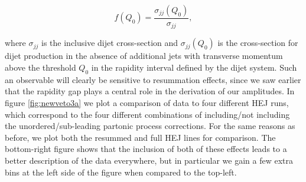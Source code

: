 \begin{equation}
f(Q_0) = \frac{\sigma_{jj}(Q_0)}{\sigma_{jj}},
\end{equation}

where $\sigma_{jj}$ is the inclusive dijet cross-section and $\sigma_{jj}(Q_0)$ is the cross-section for dijet production in the absence of additional jets with transverse momentum above the threshold $Q_0$ in the rapidity interval defined by the dijet system. Such an observable will clearly be sensitive to resummation effects, since we saw earlier that the rapidity gap plays a central role in the derivation of our amplitudes. In figure \ref{fig:newveto3a} we plot a comparison of data to four different HEJ runs, which correspond to the four different combinations of including/not including the unordered/sub-leading partonic process corrections. For the same reasons as before, we plot both the resummed and full HEJ lines for comparison. The bottom-right figure shows that the inclusion of both of these effects leads to a better description of the data everywhere, but in particular we gain a few extra bins at the left side of the figure when compared to the top-left.

